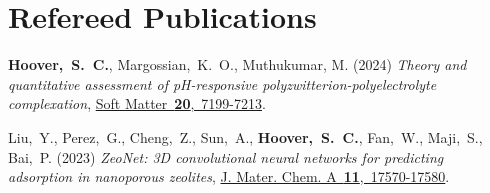 %


\section{\sc Refereed Publications}
\addtocounter{pubCounter}{-1}
\begin{etaremune}[start=\value{pubCounter}]

	\item
	      {\bf Hoover,~S.~C.},
	Margossian,~K.~O.,
	Muthukumar, M.
	(2024)
	{\it Theory and quantitative assessment of pH-responsive polyzwitterion-polyelectrolyte complexation},
	\href{https://doi.org/10.1039/D4SM00575A}{Soft Matter~{\bf 20},~7199-7213}.

	\item
	Liu,~Y.,
	Perez,~G.,
	Cheng,~Z.,
	Sun,~A.,
	{\bf Hoover,~S.~C.},
	Fan,~W.,
	Maji,~S.,
	Bai,~P.
	(2023)
	{\it ZeoNet: 3D convolutional neural networks for predicting adsorption in nanoporous zeolites},
	\href{https://doi.org/10.1039/D3TA01911J}{J. Mater. Chem. A~{\bf 11},~17570-17580}.

	\setcounter{pubCounter}{\value{enumi}}
\end{etaremune}


